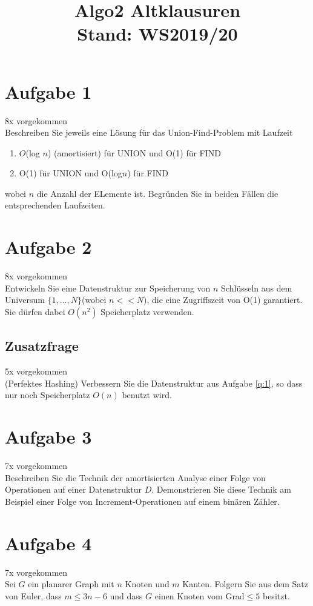 \documentclass[10pt,a4paper]{article}
\author{}
\date{}
\title{{\Huge \textbf{Algo2 Altklausuren}} \\ Stand: WS2019/20}
\begin{document}
	\maketitle
	
\section*{Aufgabe 1} 
	8x vorgekommen \\
	Beschreiben Sie jeweils eine Lösung für das Union-Find-Problem mit Laufzeit
	\begin{enumerate}
		\item $O$(log $n$) (amortisiert) für UNION und O(1) für FIND
		\item O(1) für UNION und O(log$n$) für FIND
	\end{enumerate}	
	wobei $n$ die Anzahl der ELemente ist. Begründen Sie in beiden Fällen die entsprechenden Laufzeiten.
	
\section*{Aufgabe 2}\label{q:1} 
	8x vorgekommen \\
	Entwickeln Sie eine Datenstruktur zur Speicherung von $n$ Schlüsseln aus dem Universum $\{1,...,N\}$(wobei $n<<N$), die eine Zugriffszeit von O(1) garantiert. Sie dürfen dabei $O(n^2)$ Speicherplatz verwenden.
\subsection*{Zusatzfrage} 
	5x vorgekommen \\
	(Perfektes Hashing) Verbessern Sie die Datenstruktur aus Aufgabe \ref{q:1}, so dass nur noch Speicherplatz $O(n)$ benutzt wird.
	
\section*{Aufgabe 3} 
	7x vorgekommen \\
	Beschreiben Sie die Technik der amortisierten Analyse einer Folge von Operationen auf einer Datenstruktur $D$. Demonstrieren Sie diese Technik am Beispiel einer Folge von Increment-Operationen auf einem binären Zähler.
	
\section*{Aufgabe 4}\label{q:2}
	7x vorgekommen \\
	Sei $G$ ein planarer Graph mit $n$ Knoten und $m$ Kanten. Folgern Sie aus dem Satz von Euler, dass $m\leq3n-6$ und dass $G$ einen Knoten vom Grad$\leq5$ besitzt.
\end{document}
